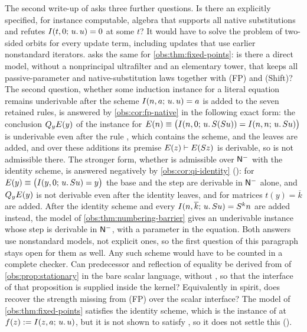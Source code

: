 \begin{question}
The second write-up of  asks three further
questions. Is there an explicitly specified, for instance computable, algebra
that supports all native substitutions and refutes $I(t,0;\,u.\,u)=0$ at some
$t$? It would have to solve the problem of two-sided orbits for every update
term, including updates that use earlier nonstandard iterators.
 asks the same for
\cref{obs:thm:fixed-points}: is there a direct model, without a nonprincipal
ultrafilter and an elementary tower, that keeps all passive-parameter and
native-substitution laws together with (FP) and (Shift)? The second question,
whether some induction instance for a literal equation remains underivable
after the scheme $I(n,a;\,u.\,u)=a$ is added to the seven retained rules, is
answered by \cref{obs:cor:fp-native} in the following exact form: the
conclusion $Q_{y}E(y)$ of the instance for
$E(n)\equiv\bigl(I(n,0;\,u.\,S(S u))=I(n,n;\,u.\,S u)\bigr)$ is
underivable even after the rule , which contains the scheme, and
the leaves  are added, and over these additions its premise
$E(z)\vdash E(S z)$ is derivable, so  is not admissible there.
The stronger form, whether  is admissible over $\mathsf{N}^{-}$ with the
identity scheme, is answered negatively by \cref{obs:cor:qi-identity}
(): for
$E(y)\equiv\bigl(I(y,0;\,u.\,S u)=y\bigr)$ the base and the step are
derivable in $\mathsf{N}^{-}$ alone, and $Q_{y}E(y)$ is not derivable even after the
identity leaves,  and  for matrices
$t(y)=\overline{k}$ are added. After the identity scheme and every
$I(n,\overline{k};\,u.\,S u)=S^{k}n$ are added instead, the model of
\cref{obs:thm:numbering-barrier} gives an underivable instance whose step is
derivable in $\mathsf{N}^{-}$, with a parameter in the equation. Both answers use
nonstandard models, not explicit ones, so the first question of this paragraph
stays open for them as well. Any such scheme would have to be counted in a
complete checker. Can predecessor and reflection of equality be derived
from  of \cref{obs:prop:stationary} in the bare scalar language,
without , so that the interface of that proposition is supplied
inside the kernel? Equivalently in spirit, does  recover the
strength missing from (FP) over the scalar interface? The model of
\cref{obs:thm:fixed-points} satisfies the identity scheme, which is the instance
of  at $f(z)\mathrel{:=}I(z,a;\,u.\,u)$, but it is not shown to
satisfy , so it does not settle this
().
\end{question}

